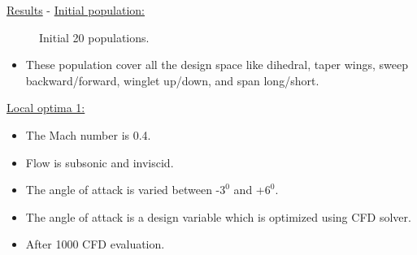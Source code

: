 \begin{frame}[allowframebreaks]{\underline{Results} -}
\underline{Initial population:}
\begin{figure} 
    \centering
    \caption{Initial 20 populations.}
    \label{initial_population}
\end{figure}
\begin{itemize}
    \item These population cover all the
design space like dihedral, taper wings, sweep backward/forward, winglet up/down, and
span long/short.
\end{itemize}

\underline{Local optima 1:}
\begin{itemize}
\item The Mach number is 0.4.
\item Flow is subsonic and inviscid.
\item The angle of attack is varied between -$3^0$ and +$6^0$.
\item The angle of attack is a design variable which is optimized using CFD solver.
\item After 1000 CFD evaluation.
\end{itemize}


\end{frame}
